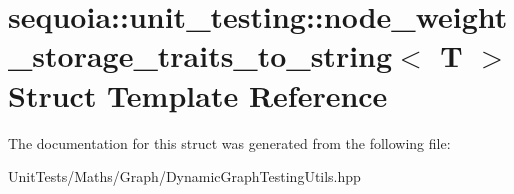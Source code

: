 \hypertarget{structsequoia_1_1unit__testing_1_1node__weight__storage__traits__to__string}{}\section{sequoia\+::unit\+\_\+testing\+::node\+\_\+weight\+\_\+storage\+\_\+traits\+\_\+to\+\_\+string$<$ T $>$ Struct Template Reference}
\label{structsequoia_1_1unit__testing_1_1node__weight__storage__traits__to__string}


The documentation for this struct was generated from the following file\+:\begin{DoxyCompactItemize}
\item 
Unit\+Tests/\+Maths/\+Graph/Dynamic\+Graph\+Testing\+Utils.\+hpp\end{DoxyCompactItemize}
